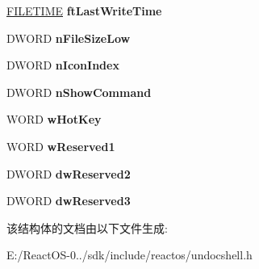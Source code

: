 \begin{DoxyCompactItemize}
\hyperlink{struct___f_i_l_e_t_i_m_e}{F\+I\+L\+E\+T\+I\+ME} {\bfseries ft\+Last\+Write\+Time}
\item 
\mbox{\label{structtag_s_h_e_l_l___l_i_n_k___h_e_a_d_e_r_a5c69200eced3d8bb1429fbf5d3b7ef7f}} 
D\+W\+O\+RD {\bfseries n\+File\+Size\+Low}
\item 
\mbox{\label{structtag_s_h_e_l_l___l_i_n_k___h_e_a_d_e_r_a4797653bad332596304e662ea293f5ef}} 
D\+W\+O\+RD {\bfseries n\+Icon\+Index}
\item 
\mbox{\label{structtag_s_h_e_l_l___l_i_n_k___h_e_a_d_e_r_ae3d8949a1089b87f817faea63e09ba2c}} 
D\+W\+O\+RD {\bfseries n\+Show\+Command}
\item 
\mbox{\label{structtag_s_h_e_l_l___l_i_n_k___h_e_a_d_e_r_a198e06f8055252676804b286f893c430}} 
W\+O\+RD {\bfseries w\+Hot\+Key}
\item 
\mbox{\label{structtag_s_h_e_l_l___l_i_n_k___h_e_a_d_e_r_ab52e56ee6e4ce8e7275006304cf36c7d}} 
W\+O\+RD {\bfseries w\+Reserved1}
\item 
\mbox{\label{structtag_s_h_e_l_l___l_i_n_k___h_e_a_d_e_r_ae92dcc3770b4a51463146e1161ef7e5e}} 
D\+W\+O\+RD {\bfseries dw\+Reserved2}
\item 
\mbox{\label{structtag_s_h_e_l_l___l_i_n_k___h_e_a_d_e_r_a57374df6a98143b0eb018eced40cc939}} 
D\+W\+O\+RD {\bfseries dw\+Reserved3}
\end{DoxyCompactItemize}


该结构体的文档由以下文件生成\+:\begin{DoxyCompactItemize}
\item 
E\+:/\+React\+O\+S-\/0../sdk/include/reactos/undocshell.\+h\end{DoxyCompactItemize}
